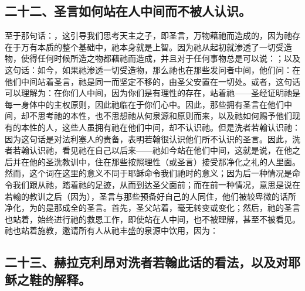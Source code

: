 
\subsection{二十二、圣言如何站在人中间而不被人认识。}

至于那句话：，这引导我们思考天主之子，即圣言，万物藉祂而造成的，因为祂存在于万有本质的整个基础中，祂本身就是上智。因为祂从起初就渗透了一切受造物，使得任何时候所造之物都藉祂而造成，并且对于任何事物总是可以说：；以及这句话：如今，如果祂渗透一切受造物，那么祂也在那些发问者中间，他们问：在他们中间站着圣言，祂是同一而坚定不移的，由圣父安置在一切处。或者，这句话可以理解为：在你们人中间，因为你们是有理性的存在，站着祂——圣经证明祂是每一身体中的主权原则，因此祂临在于你们心中。因此，那些拥有圣言在他们中间，却不思考祂的本性，也不思想祂从何泉源和原则而来，以及祂如何赐予他们现有的本性的人，这些人虽拥有祂在他们中间，却不认识祂。但是洗者若翰认识祂：因为这句话是对法利塞人的责备，表明若翰很认识他们所不认识的圣言。因此，洗者若翰认识祂，看见祂在自己以后来——祂如今站在他们中间，这就是说，在他之后并在他的圣洗教训中，住在那些按照理性（或圣言）接受那净化之礼的人里面。然而，这个词在这里的意义不同于耶稣命令我们祂时的意义；因为后一种情况是命令我们跟从祂，踏着祂的足迹，从而到达圣父面前；而在前一种情况，意思是说在若翰的教训之后（因为），圣言与那些预备好自己的人同住，他们被较卑微的话所净化，为的是那成全的圣言。首先，圣父站着，毫无转变或变化；然后，祂的圣言也站着，始终进行祂的救恩工作，即使站在人中间，也不被理解，甚至不被看见。祂也站着施教，邀请所有人从祂丰盛的泉源中饮用，因为：\par


\subsection{二十三、赫拉克利昂对洗者若翰此话的看法，以及对耶稣之鞋的解释。}

